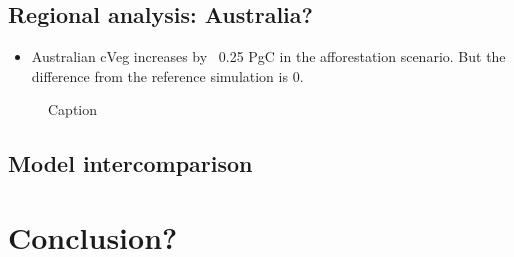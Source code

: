 \documentclass[]{article}
\begin{document}
\pagebreak

\subsection{Regional analysis: Australia?}

\begin{itemize}
    \item Australian cVeg increases by ~0.25 PgC in the afforestation scenario. But the difference from the reference simulation is 0.
\end{itemize}

\begin{figure}
    \centering
    \begin{subfigure}[b]{0.4\linewidth}
        
    \end{subfigure}
    \begin{subfigure}[b]{0.4\linewidth}
        
    \end{subfigure}
    \begin{subfigure}[b]{0.4\linewidth}
        
    \end{subfigure}
    \begin{subfigure}[b]{0.4\linewidth}
        
    \end{subfigure}
    \begin{subfigure}[b]{0.4\linewidth}
        
    \end{subfigure}
    \begin{subfigure}[b]{0.4\linewidth}
        
    \end{subfigure}
    \caption{Caption}
    \label{fig:aus_region}
\end{figure}

\subsection{Model intercomparison}


\section{Conclusion?}

\printbibliography
\end{document}

